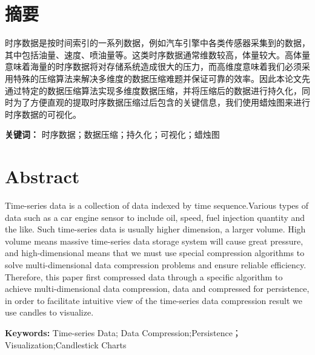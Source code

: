 
\chapter*{摘要}
\label{Abstract CN}
时序数据是按时间索引的一系列数据，例如汽车引擎中各类传感器采集到的数据，其中包括油量、速度、喷油量等。这类时序数据通常维数较高，体量较大。高体量意味着海量的时序数据将对存储系统造成很大的压力，而高维度意味着我们必须采用特殊的压缩算法来解决多维度的数据压缩难题并保证可靠的效率。因此本论文先通过特定的数据压缩算法实现多维度数据压缩，并将压缩后的数据进行持久化，同时为了方便直观的提取时序数据压缩过后包含的关键信息，我们使用蜡烛图来进行时序数据的可视化。
\hfill\break

\textbf{关键词：} 时序数据；数据压缩；持久化；可视化；蜡烛图

\chapter*{Abstract}
\label{Abstract EN}

Time-series data is a collection of data indexed by time sequence.Various types of data such as a car engine sensor to include oil, speed, fuel injection quantity and the like. Such time-series data is usually higher dimension, a larger volume. High volume means massive time-series data storage system will cause great pressure, and high-dimensional means that we must use special compression algorithms to solve multi-dimensional data compression problems and ensure reliable efficiency. Therefore, this paper first compressed data through a specific algorithm to achieve multi-dimensional data compression, data and compressed for persistence, in order to facilitate intuitive view of the time-series data compression result we use candles to visualize.
\hfill\break

\textbf{Keywords:} Time-series Data; Data Compression;Persistence；Visualization;Candlestick Charts
